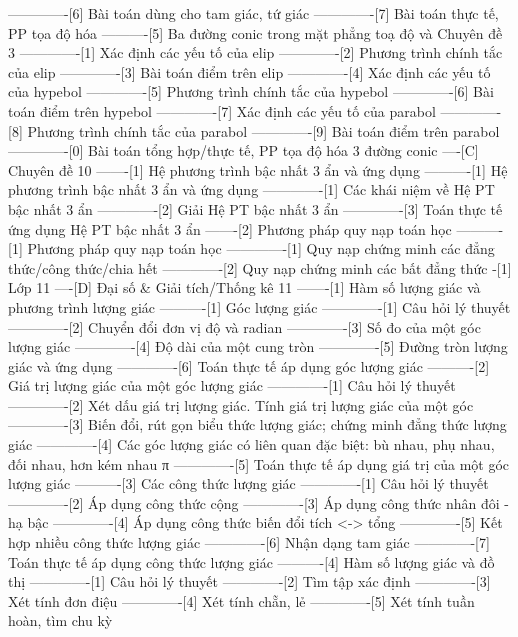 -------------[6] Bài toán dùng cho tam giác, tứ giác
-------------[7] Bài toán thực tế, PP tọa độ hóa
----------[5] Ba đường conic trong mặt phẳng toạ độ và Chuyên đề 3
-------------[1] Xác định các yếu tố của elip
-------------[2] Phương trình chính tắc của elip
-------------[3] Bài toán điểm trên elip
-------------[4] Xác định các yếu tố của hypebol
-------------[5] Phương trình chính tắc của hypebol
-------------[6] Bài toán điểm trên hypebol
-------------[7] Xác định các yếu tố của parabol
-------------[8] Phương trình chính tắc của parabol
-------------[9] Bài toán điểm trên parabol
-------------[0] Bài toán tổng hợp/thực tế, PP tọa độ hóa 3 đường conic
----[C] Chuyên đề 10
-------[1] Hệ phương trình bậc nhất 3 ẩn và ứng dụng
----------[1] Hệ phương trình bậc nhất 3 ẩn và ứng dụng
-------------[1] Các khái niệm về Hệ PT bậc nhất 3 ẩn
-------------[2] Giải Hệ PT bậc nhất 3 ẩn
-------------[3] Toán thực tế ứng dụng Hệ PT bậc nhất 3 ẩn
-------[2] Phương pháp quy nạp toán học
----------[1] Phương pháp quy nạp toán học
-------------[1] Quy nạp chứng minh các đẳng thức/công thức/chia hết
-------------[2] Quy nạp chứng minh các bất đẳng thức
-[1] Lớp 11
----[D] Đại số & Giải tích/Thống kê 11
-------[1] Hàm số lượng giác và phương trình lượng giác
----------[1] Góc lượng giác
-------------[1] Câu hỏi lý thuyết
-------------[2] Chuyển đổi đơn vị độ và radian
-------------[3] Số đo của một góc lượng giác
-------------[4] Độ dài của một cung tròn
-------------[5] Đường tròn lượng giác và ứng dụng
-------------[6] Toán thực tế áp dụng góc lượng giác
----------[2] Giá trị lượng giác của một góc lượng giác
-------------[1] Câu hỏi lý thuyết
-------------[2] Xét dấu giá trị lượng giác. Tính giá trị lượng giác của một góc
-------------[3] Biến đổi, rút gọn biểu thức lượng giác; chứng minh đẳng thức lượng giác
-------------[4] Các góc lượng giác có liên quan đặc biệt: bù nhau, phụ nhau, đối nhau, hơn kém nhau π
-------------[5] Toán thực tế áp dụng giá trị của một góc lượng giác
----------[3] Các công thức lượng giác
-------------[1] Câu hỏi lý thuyết
-------------[2] Áp dụng công thức cộng
-------------[3] Áp dụng công thức nhân đôi - hạ bậc
-------------[4] Áp dụng công thức biến đổi tích <-> tổng
-------------[5] Kết hợp nhiều công thức lượng giác
-------------[6] Nhận dạng tam giác
-------------[7] Toán thực tế áp dụng công thức lượng giác
----------[4] Hàm số lượng giác và đồ thị
-------------[1] Câu hỏi lý thuyết
-------------[2] Tìm tập xác định
-------------[3] Xét tính đơn điệu
-------------[4] Xét tính chẵn, lẻ
-------------[5] Xét tính tuần hoàn, tìm chu kỳ
